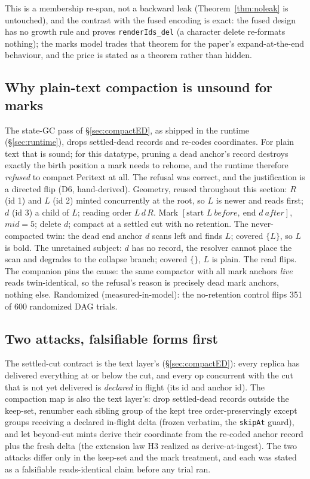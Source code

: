 \documentclass[11pt]{article}
\newcommand{\lean}[1]{\texttt{#1}}
\begin{document}
\noindent This is a membership re-span, not a backward leak
(Theorem~\ref{thm:noleak} is untouched), and the contrast with the
fused encoding is exact: the fused design has no growth rule and
proves \lean{renderIds\_del} (a character delete re-formats nothing);
the marks model trades that theorem for the paper's
expand-at-the-end behaviour, and the price is stated as a theorem
rather than hidden.

\subsection{Why plain-text compaction is unsound for marks}
\label{sec:marksrefusal}

The state-GC pass of \S\ref{sec:compactED}, as shipped in the runtime
(\S\ref{sec:runtime}), drops settled-dead records and re-codes
coordinates. For plain text that is sound; for this datatype, pruning
a dead anchor's record destroys exactly the birth position a mark
needs to rehome, and the runtime therefore \emph{refused} to compact
Peritext at all. The refusal was correct, and the justification is a
directed flip (D6, hand-derived). Geometry,
reused throughout this section: $R$ (id 1) and $L$ (id 2) minted
concurrently at the root, so $L$ is newer and reads first; $d$ (id 3)
a child of $L$; reading order $L\,d\,R$. Mark $[\text{start } L\
\mathit{before},\ \text{end } d\ \mathit{after}]$, $\mathit{mid} = 5$;
delete $d$; compact at a settled cut with no retention. The
never-compacted twin: the dead end anchor $d$ scans left and finds
$L$; covered $\{L\}$, so $L$ is bold. The unretained subject: $d$ has
no record, the resolver cannot place the scan and degrades to the
collapse branch; covered $\{\}$, $L$ is plain. The read flips. The
companion pins the cause: the same compactor with all mark anchors
\emph{live} reads twin-identical, so the refusal's reason is precisely
dead mark anchors, nothing else. Randomized (measured-in-model): the
no-retention control flips 351 of 600 randomized DAG trials.

\subsection{Two attacks, falsifiable forms first}
\label{sec:marksattacks}

The settled-cut contract is the text layer's (\S\ref{sec:compactED}):
every replica has delivered everything at or below the cut, and every
op concurrent with the cut that is not yet delivered is
\emph{declared} in flight (its id and anchor id). The compaction map
is also the text layer's: drop settled-dead records outside the
keep-set, renumber each sibling group of the kept tree
order-preservingly except groups receiving a declared in-flight delta
(frozen verbatim, the \lean{skipAt} guard), and let beyond-cut mints
derive their coordinate from the re-coded anchor record plus the fresh
delta (the extension law H3 realized as derive-at-ingest). The two
attacks differ only in the keep-set and the mark treatment, and each
was stated as a falsifiable reads-identical claim before any trial
ran.
\end{document}
